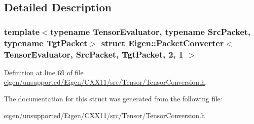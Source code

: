 \subsection{Detailed Description}
\subsubsection*{template$<$typename Tensor\+Evaluator, typename Src\+Packet, typename Tgt\+Packet$>$\newline
struct Eigen\+::\+Packet\+Converter$<$ Tensor\+Evaluator, Src\+Packet, Tgt\+Packet, 2, 1 $>$}



Definition at line \hyperlink{eigen_2unsupported_2_eigen_2_c_x_x11_2src_2_tensor_2_tensor_conversion_8h_source_l00069}{69} of file \hyperlink{eigen_2unsupported_2_eigen_2_c_x_x11_2src_2_tensor_2_tensor_conversion_8h_source}{eigen/unsupported/\+Eigen/\+C\+X\+X11/src/\+Tensor/\+Tensor\+Conversion.\+h}.



The documentation for this struct was generated from the following file\+:\begin{DoxyCompactItemize}
\item 
eigen/unsupported/\+Eigen/\+C\+X\+X11/src/\+Tensor/\+Tensor\+Conversion.\+h\end{DoxyCompactItemize}
